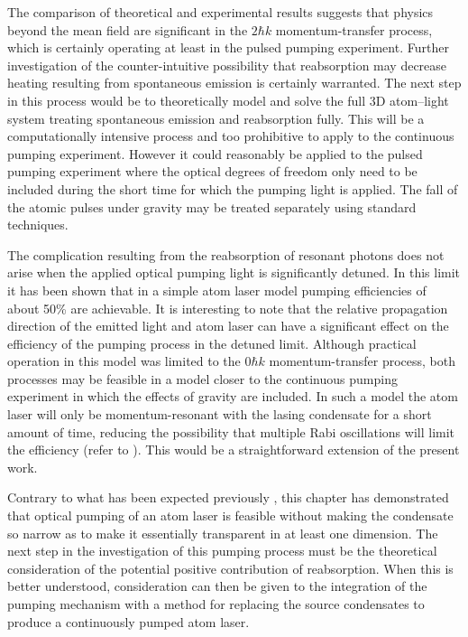 The comparison of theoretical and experimental results suggests that physics beyond the mean field are significant in the $2 \hbar k$ momentum-transfer process, which is certainly operating at least in the pulsed pumping experiment.  Further investigation of the counter-intuitive possibility that reabsorption may decrease heating resulting from spontaneous emission is certainly warranted.  The next step in this process would be to theoretically model and solve the full 3D atom--light system treating spontaneous emission and reabsorption fully.  This will be a computationally intensive process and too prohibitive to apply to the continuous pumping experiment.  However it could reasonably be applied to the pulsed pumping experiment where the optical degrees of freedom only need to be included during the short time for which the pumping light is applied.  The fall of the atomic pulses under gravity may be treated separately using standard techniques.

The complication resulting from the reabsorption of resonant photons does not arise when the applied optical pumping light is significantly detuned.  In this limit it has been shown that in a simple atom laser model pumping efficiencies of about 50\% are achievable.  It is interesting to note that the relative propagation direction of the emitted light and atom laser can have a significant effect on the efficiency of the pumping process in the detuned limit.  Although practical operation in this model was limited to the $0 \hbar k$ momentum-transfer process, both processes may be feasible in a model closer to the continuous pumping experiment in which the effects of gravity are included.  In such a model the atom laser will only be momentum-resonant with the lasing condensate for a short amount of time, reducing the possibility that multiple Rabi oscillations will limit the efficiency (refer to ).  This would be a straightforward extension of the present work.

\parasep

Contrary to what has been expected previously \citep{Spreeuw:1995,Olshanii:1996}, this chapter has demonstrated that optical pumping of an atom laser is feasible without making the condensate so narrow as to make it essentially transparent in at least one dimension.  The next step in the investigation of this pumping process must be the theoretical consideration of the potential positive contribution of reabsorption.  When this is better understood, consideration can then be given to the integration of the pumping mechanism with a method for replacing the source condensates to produce a continuously pumped atom laser.

